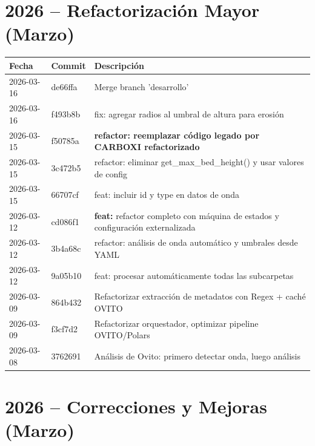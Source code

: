\documentclass[12pt,a4paper]{article}
\begin{document}
\section*{2026 -- Refactorización Mayor (Marzo)}

\begin{longtable}{@{}llp{10cm}@{}}
	\toprule
	\textbf{Fecha} & \textbf{Commit} & \textbf{Descripción}                                                                  \\
	\midrule
	2026-03-16     & de66ffa         & Merge branch 'desarrollo'                                                             \\
	2026-03-16     & f493b8b         & fix: agregar radios al umbral de altura para erosión                                  \\
	2026-03-15     & f50785a         & \textbf{refactor: reemplazar código legado por CARBOXI refactorizado}                 \\
	2026-03-15     & 3c472b5         & refactor: eliminar get\_max\_bed\_height() y usar valores de config                   \\
	2026-03-15     & 66707cf         & feat: incluir id y type en datos de onda                                              \\
	2026-03-12     & cd086f1         & \textbf{feat:} refactor completo con máquina de estados y configuración externalizada \\
	2026-03-12     & 3b4a68c         & refactor: análisis de onda automático y umbrales desde YAML                           \\
	2026-03-12     & 9a05b10         & feat: procesar automáticamente todas las subcarpetas                                  \\
	2026-03-09     & 864b432         & Refactorizar extracción de metadatos con Regex + caché OVITO                          \\
	2026-03-09     & f3cf7d2         & Refactorizar orquestador, optimizar pipeline OVITO/Polars                             \\
	2026-03-08     & 3762691         & Análisis de Ovito: primero detectar onda, luego análisis                              \\
	\bottomrule
\end{longtable}

\section*{2026 -- Correcciones y Mejoras (Marzo)}
\end{document}
